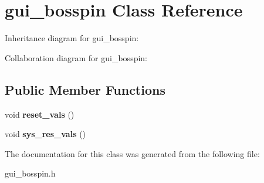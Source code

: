 \hypertarget{classgui__bosspin}{}\section{gui\+\_\+bosspin Class Reference}
\label{classgui__bosspin}


Inheritance diagram for gui\+\_\+bosspin\+:


Collaboration diagram for gui\+\_\+bosspin\+:
\subsection*{Public Member Functions}
\begin{DoxyCompactItemize}
\item 
void {\bfseries reset\+\_\+vals} ()\hypertarget{classgui__bosspin_a74ad119b43bd266a360bb855e8e09f3b}{}\label{classgui__bosspin_a74ad119b43bd266a360bb855e8e09f3b}

\item 
void {\bfseries sys\+\_\+res\+\_\+vals} ()\hypertarget{classgui__bosspin_a63eadfa8904dbec6212b56a0fee22342}{}\label{classgui__bosspin_a63eadfa8904dbec6212b56a0fee22342}

\end{DoxyCompactItemize}


The documentation for this class was generated from the following file\+:\begin{DoxyCompactItemize}
\item 
gui\+\_\+bosspin.\+h\end{DoxyCompactItemize}
